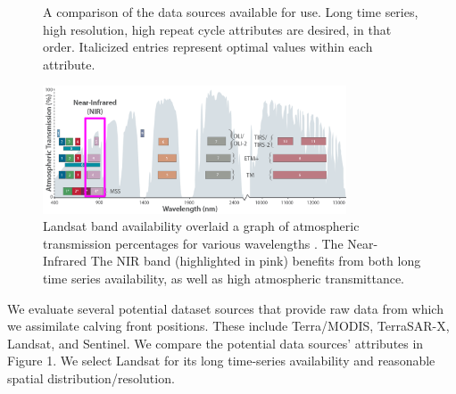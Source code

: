 \documentclass[tc, manuscript]{copernicus}
\begin{document}
\begin{figure}
\noindent
\begin{minipage}{9.0cm}
    \caption{A comparison of the data sources available for use. Long time series, high resolution, high repeat cycle attributes are desired, in that order. Italicized entries represent optimal values within each attribute. }
    \label{tab:table-data_source}
\end{minipage}

\begin{minipage}{9.0cm}
    \includegraphics[width=9.0cm]{all_Landsat_bands_annotated.png}
    \caption{Landsat band availability overlaid a graph of atmospheric transmission percentages for various wavelengths \citep{mase2019}. The Near-Infrared The NIR band (highlighted in pink) benefits from both long time series availability, as well as high atmospheric transmittance.}
\end{minipage}
\end{figure}

We evaluate several potential dataset sources that provide raw data from which we assimilate calving front positions. These include Terra/MODIS, TerraSAR-X, Landsat, and Sentinel. We compare the potential data sources' attributes in Figure 1. We select Landsat for its long time-series availability and reasonable spatial distribution/resolution.
\end{document}
